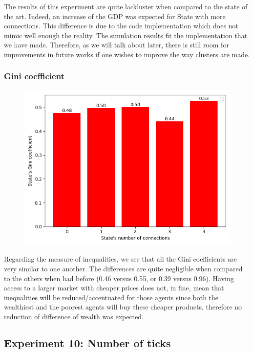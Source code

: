 {{{{{{{{{        The results of this experiment are quite lackluster when compared to the state of the art. Indeed, an increase of the GDP was expected for State with more connections. This difference is due to the code implementation which does not mimic well enough the reality. The simulation results fit the implementation that we have made. Therefore, as we will talk about later, there is still room for improvements in future works if one wishes to improve the way clusters are made.
        \par

        \subsubsection{Gini coefficient}

        \begin{figure}
            \includegraphics[width=\linewidth]{img/exp/9_3.png} 
        \end{figure}   
        { Regarding the measure of inequalities, we see that all the Gini coefficients are very similar to one another. The differences are quite negligible when compared to the others when had before (0.46 versus 0.55, or 0.39 versus 0.96). Having access to a larger market with cheaper prices does not, in fine, mean that inequalities will be reduced/accentuated for those agents since both the wealthiest and the poorest agents will buy these cheaper products, therefore no reduction of difference of wealth was expected. 
        \par
    

    \subsection{Experiment 10: Number of ticks}
        
}}}}}}}}}}
